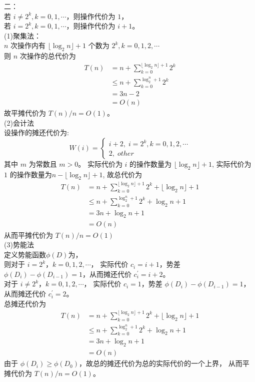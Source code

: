 \documentclass{article}
\begin{document}
\newpage
二：\\
若 $i \neq 2^k, k = 0, 1, \cdots$，则操作代价为 $1$，\\
若 $i = 2^k, k = 0, 1, \cdots$，则操作代价为 $i + 1$。\\
(1)聚集法：\\
$n$ 次操作内有 $\lfloor{\log_{2}n}\rfloor + 1$ 个数为 
$2^k, k = 0, 1, 2, \cdots$ \\
则 $n$ 次操作的总代价为
\[
\begin{aligned}
T(n) & = n + \sum\limits_{k = 0}^{\lfloor{\log_{2}n}\rfloor + 1}2^k \\
     & \leq n + \sum\limits_{k = 0}^{\log_2^n + 1}2^k \\
     & = 3n - 2 \\
     & = O(n) 
\end{aligned} 
\]
故平摊代价为 $T(n) / n = O(1)$。\\
(2)会计法\\
设操作的摊还代价为:
\[
W(i) = 
\begin{cases}
i + 2,\; i = 2^k, k = 0, 1, 2, \cdots \\
2,\; other  
\end{cases}
\]
其中 $m$ 为常数且 $m > 0$。
实际代价为 $i$ 的操作数量为 $\lfloor{\log_{2}n}\rfloor + 1$,
实际代价为 $1$ 的操作数量为$n - \lfloor{\log_{2}n}\rfloor + 1$,
故总代价为
\[
\begin{aligned}
     T(n) & = n + \sum\limits_{k = 0}^{\lfloor{\log_{2}n}\rfloor + 1}2^k + \lfloor{\log_{2}n}\rfloor + 1\\
          & \leq n + \sum\limits_{k = 0}^{\log_2^n + 1}2^k + \log_2n + 1\\
          & = 3n + \log_2n + 1 \\
          & = O(n) 
\end{aligned} 
\]
从而平摊代价为 $T(n) / n = O(1)$\\
(3)势能法\\
定义势能函数$\phi(D)$为，\\
则对于 $i = 2^k， k = 0, 1, 2, \cdots$，
实际代价 $c_i = i + 1$，势差 $\phi(D_i) - \phi(D_{i - 1}) = 1$，从而摊还代价
$c_i^{'} = i + 2$。\\
对于 $i \neq 2^k， k = 0, 1, 2, \cdots$，
实际代价 $c_i = 1$，势差 $\phi(D_i) - \phi(D_{i - 1}) = 1$，从而摊还代价
$c_i^{'} = 2$。\\
总摊还代价为
\[
\begin{aligned}
     T(n) & = n + \sum\limits_{k = 0}^{\lfloor{\log_{2}n}\rfloor + 1}2^k + \lfloor{\log_{2}n}\rfloor + 1\\
          & \leq n + \sum\limits_{k = 0}^{\log_2^n + 1}2^k + \log_2n + 1\\
          & = 3n + \log_2n + 1 \\
          & = O(n) 
\end{aligned} 
\]
由于 $\phi(D_i) \geq \phi(D_0)$，故总的摊还代价为总的实际代价的一个上界，
从而平摊代价为 $T(n) / n = O(1)$。
\end{document}

